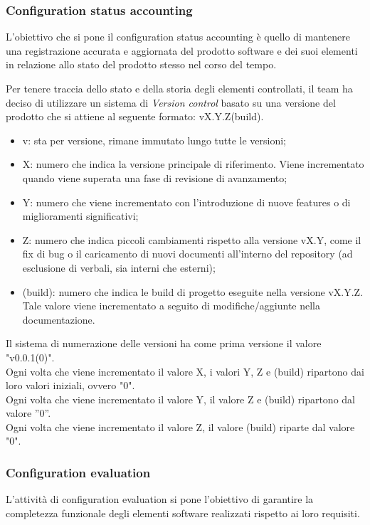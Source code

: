 \documentclass[10pt, a4paper]{article}
\begin{document}
\subsubsection{Configuration status accounting}
L'obiettivo che si pone il configuration status accounting è quello di mantenere una registrazione accurata e aggiornata del prodotto software e dei suoi elementi in relazione allo stato del prodotto stesso nel corso del tempo.

\label{sec:version}
Per tenere traccia dello stato e della storia degli elementi controllati, il team ha deciso di utilizzare un sistema di \textit{Version control} basato su una versione 
del prodotto che si attiene al seguente formato: vX.Y.Z(build).
\begin{itemize}
    \item v: sta per versione, rimane immutato lungo tutte le versioni;
    \item X: numero che indica la versione principale di riferimento. Viene incrementato quando viene superata una fase di revisione di avanzamento;
    \item Y: numero che viene incrementato con l'introduzione di nuove features o di miglioramenti significativi;
    \item Z:  numero che indica piccoli cambiamenti rispetto alla versione vX.Y, come il fix di bug o il caricamento di nuovi documenti all'interno del repository (ad esclusione di verbali, sia interni che esterni);
    \item (build): numero che indica le build di progetto eseguite nella versione vX.Y.Z. Tale valore viene incrementato a seguito di modifiche/aggiunte nella documentazione.
\end{itemize}
Il sistema di numerazione delle versioni ha come prima versione il valore "v0.0.1(0)".\\
Ogni volta che viene incrementato il valore X, i valori Y, Z e (build) ripartono dai loro valori iniziali, ovvero "0".\\
Ogni volta che viene incrementato il valore Y, il valore Z e (build) ripartono dal valore ”0”.\\
Ogni volta che viene incrementato il valore Z, il valore (build) riparte dal valore "0".

\subsubsection{Configuration evaluation}
L'attività di configuration evaluation si pone l'obiettivo di garantire la completezza funzionale degli elementi software realizzati rispetto ai loro
requisiti.
\end{document}
